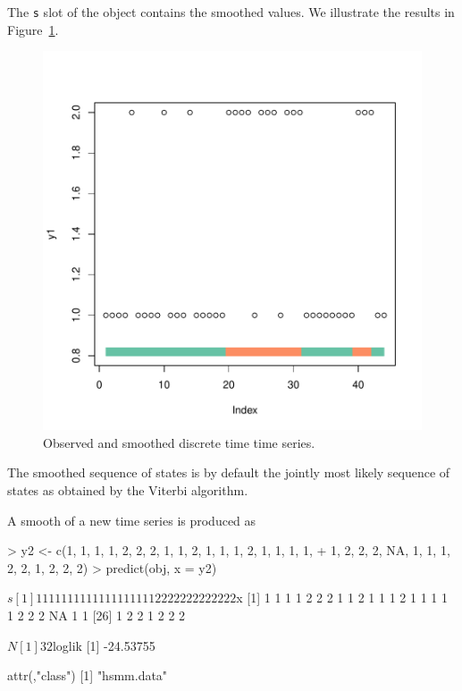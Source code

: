 \documentclass{article}
\begin{document}
The \verb's' slot of the object contains the smoothed values. We
illustrate the results in Figure~\ref{fig:smooth1}.

\begin{Schunk}
\end{Schunk}

\begin{figure}[h]
  \centering
  \includegraphics{fig/smooth-smooth1}
  \caption{Observed and smoothed discrete time time series.}
  \label{fig:smooth1}
\end{figure}

The smoothed sequence of states is by default the jointly most likely
sequence of states as obtained by the Viterbi algorithm.

A smooth of a new time series is produced as
\begin{Schunk}
\begin{Sinput}
> y2 <- c(1, 1, 1, 1, 2, 2, 2, 1, 1, 2, 1, 1, 1, 2, 1, 1, 1, 1, 
+     1, 2, 2, 2, NA, 1, 1, 1, 2, 2, 1, 2, 2, 2)
> predict(obj, x = y2)
\end{Sinput}
\begin{Soutput}
$s
 [1] 1 1 1 1 1 1 1 1 1 1 1 1 1 1 1 1 1 1 1 2 2 2 2 2 2 2 2 2 2 2 2 2

$x
 [1]  1  1  1  1  2  2  2  1  1  2  1  1  1  2  1  1  1  1  1  2  2  2 NA  1  1
[26]  1  2  2  1  2  2  2

$N
[1] 32

$loglik
[1] -24.53755

attr(,"class")
[1] "hsmm.data"
\end{Soutput}
\end{Schunk}
\end{document}
